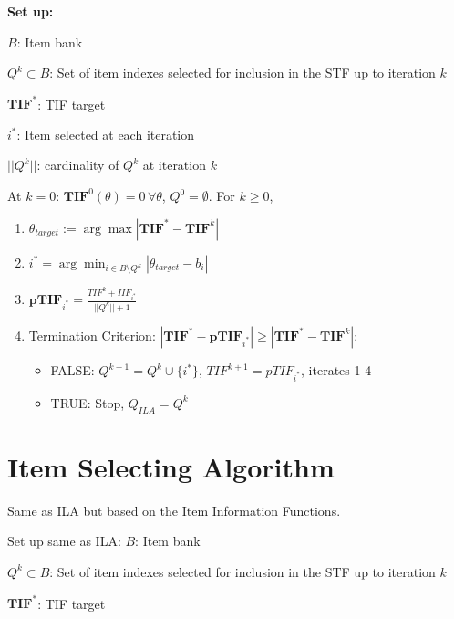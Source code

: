 \documentclass[12pt, a4paper, titilepage]{article}
\begin{document}
\textbf{Set up: }

$B$: Item bank 


$Q^k \subset B$: Set of item indexes selected for inclusion in the STF up to iteration $k$

$\mathbf{TIF}^*$: TIF target 

$i^*$: Item selected at each iteration


$||Q^k||$: cardinality of $Q^k$ at iteration $k$

At $k = 0$: $\mathbf{TIF}^0(\theta) = 0 \, \forall \theta$, $Q^0 = \emptyset$. For $k \geq 0$,

\begin{enumerate}
	\item $\theta_{target} := \arg \max |\mathbf{TIF}^* - \mathbf{TIF}^{k}|$
	\item $i^* = \arg \min_{i \in B\setminus Q^{k}} |\theta_{target} - b_i|$
	\item $\mathbf{pTIF}_{i^*} = \frac{TIF^k + IIF_{i^*}}{||Q^{k}|| + 1}$ %
	\item Termination Criterion: $|\mathbf{TIF}^* - \mathbf{pTIF}_{i^*}| \geq |\mathbf{TIF}^* - \mathbf{TIF}^{k}|$: 
	\begin{itemize}
		\item FALSE:  $Q^{k+1} = Q^{k} \cup \{i^*\}$, $TIF^{k+1} = pTIF_{i^*}$, iterates 1-4 
		\item TRUE: Stop, %
		$Q_{ILA} = Q^k$
	\end{itemize}
\end{enumerate}


\section{Item Selecting Algorithm}

Same as ILA but based on the Item Information Functions. 

\color{blue}

Set up same as ILA: 
$B$: Item bank 


$Q^k \subset B$: Set of item indexes selected for inclusion in the STF up to iteration $k$

$\mathbf{TIF}^*$: TIF target 
\end{document}
